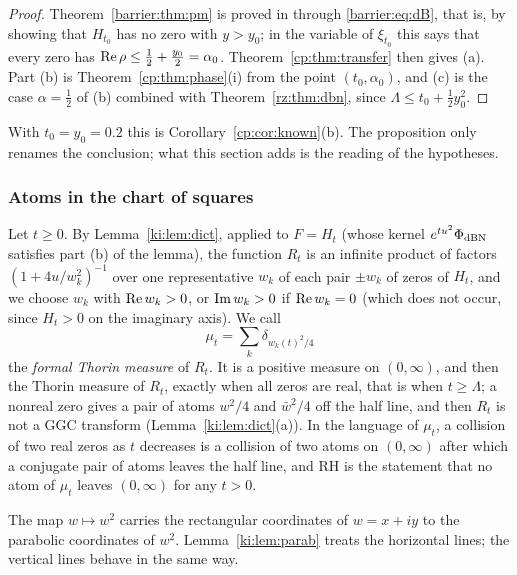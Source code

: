 \begin{proof}
Theorem~\ref{barrier:thm:pm} is proved in \cite[Proposition 3.3]{Polymath} through \eqref{barrier:eq:dB}, that is, by showing that $H_{t_0}$ has no zero with $y>y_0$; in the variable of $\xi_{t_0}$ this says that every zero has $\operatorname{Re}\rho\le\frac12+\frac{y_0}2=\alpha_0$. Theorem~\ref{cp:thm:transfer} then gives (a). Part (b) is Theorem~\ref{cp:thm:phase}(i) from the point $(t_0,\alpha_0)$, and (c) is the case $\alpha=\frac12$ of (b) combined with Theorem~\ref{rz:thm:dbn}, since $\Lambda\le t_0+\frac12y_0^2$.
\end{proof}

With $t_0=y_0=0.2$ this is Corollary~\ref{cp:cor:known}(b). The proposition only renames the conclusion; what this section adds is the reading of the hypotheses.

\subsubsection{Atoms in the chart of squares}

Let $t\ge0$. By Lemma~\ref{ki:lem:dict}, applied to $F=H_t$ (whose kernel $e^{tu^2}\Phi_{\rm dBN}$ satisfies part (b) of the lemma), the function $R_t$ is an infinite product of factors $(1+4u/w_k^2)^{-1}$ over one representative $w_k$ of each pair $\pm w_k$ of zeros of $H_t$, and we choose $w_k$ with $\operatorname{Re} w_k>0$, or $\operatorname{Im} w_k>0$ if $\operatorname{Re} w_k=0$ (which does not occur, since $H_t>0$ on the imaginary axis). We call
\[
\mu_t=\sum_k\delta_{w_k(t)^2/4}
\]
the \emph{formal Thorin measure} of $R_t$. It is a positive measure on $(0,\infty)$, and then the Thorin measure of $R_t$, exactly when all zeros are real, that is when $t\ge\Lambda$; a nonreal zero gives a pair of atoms $w^2/4$ and $\bar w^2/4$ off the half line, and then $R_t$ is not a GGC transform (Lemma~\ref{ki:lem:dict}(a)). In the language of $\mu_t$, a collision of two real zeros as $t$ decreases is a collision of two atoms on $(0,\infty)$ after which a conjugate pair of atoms leaves the half line, and RH is the statement that no atom of $\mu_t$ leaves $(0,\infty)$ for any $t>0$.

The map $w\mapsto w^2$ carries the rectangular coordinates of $w=x+iy$ to the parabolic coordinates of $w^2$. Lemma~\ref{ki:lem:parab} treats the horizontal lines; the vertical lines behave in the same way.

